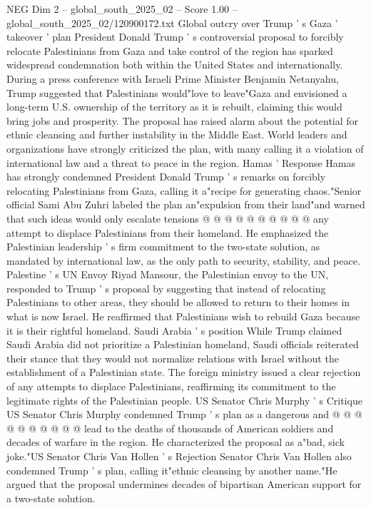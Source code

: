 \begin{textsample}{NEG Dim 2 – global\_south\_2025\_02 – Score 1.00 – global\_south\_2025\_02/120900172.txt}  \label{ex:f2_neg_020}
Global outcry over Trump ' s Gaza ' takeover ' plan President Donald Trump ' s controversial proposal to forcibly relocate Palestinians from Gaza and take control of the region has sparked widespread condemnation both within the United States and internationally.
During a press conference with Israeli Prime Minister Benjamin Netanyahu, Trump suggested that Palestinians would"love to leave"Gaza and envisioned a long-term U.S. ownership of the territory as it is rebuilt, claiming this would bring jobs and prosperity.
The proposal has raised alarm about the potential for ethnic cleansing and further instability in the Middle East.
World leaders and organizations have strongly criticized the plan, with many calling it a violation of international law and a threat to peace in the region.
Hamas ' Response Hamas has strongly condemned President Donald Trump ' s remarks on forcibly relocating Palestinians from Gaza, calling it a"recipe for generating chaos."Senior official Sami Abu Zuhri labeled the plan an"expulsion from their land"and warned that such ideas would only escalate tensions @ @ @ @ @ @ @ @ @ @ any attempt to displace Palestinians from their homeland.
He emphasized the Palestinian leadership ' s firm commitment to the two-state solution, as mandated by international law, as the only path to security, stability, and peace.
Palestine ' s UN Envoy Riyad Mansour, the Palestinian envoy to the UN, responded to Trump ' s proposal by suggesting that instead of relocating Palestinians to other areas, they should be allowed to return to their homes in what is now Israel.
He reaffirmed that Palestinians wish to rebuild Gaza because it is their rightful homeland.
Saudi Arabia ' s position While Trump claimed Saudi Arabia did not prioritize a Palestinian homeland, Saudi officials reiterated their stance that they would not normalize relations with Israel without the establishment of a Palestinian state.
The foreign ministry issued a clear rejection of any attempts to displace Palestinians, reaffirming its commitment to the legitimate rights of the Palestinian people.
US Senator Chris Murphy ' s Critique US Senator Chris Murphy condemned Trump ' s plan as a dangerous and @ @ @ @ @ @ @ @ @ @ lead to the deaths of thousands of American soldiers and decades of warfare in the region.
He characterized the proposal as a"bad, sick joke."US Senator Chris Van Hollen ' s Rejection Senator Chris Van Hollen also condemned Trump ' s plan, calling it"ethnic cleansing by another name."He argued that the proposal undermines decades of bipartisan American support for a two-state solution.

\end{textsample}
